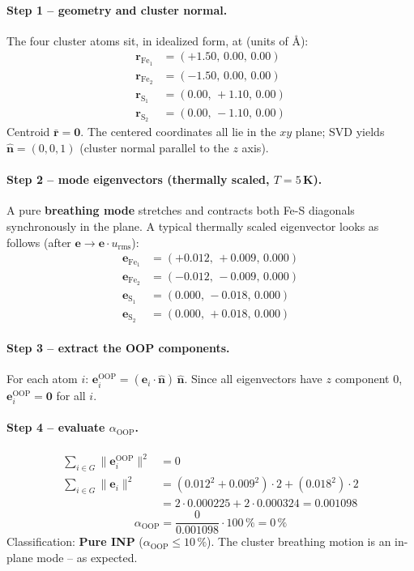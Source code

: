 \documentclass[11pt,a4paper,twoside]{article}
\providecommand{\angstrom}{\text{\AA}}    %
\newcommand{\OOP}{\mathrm{OOP}}
\theoremstyle{remark}
\begin{document}
\paragraph{Step 1 -- geometry and cluster normal.}
The four cluster atoms sit, in idealized form, at (units of $\angstrom$):
\begin{align*}
  \mathbf{r}_{\text{Fe}_1} &= (+1.50,\, 0.00,\, 0.00) \\
  \mathbf{r}_{\text{Fe}_2} &= (-1.50,\, 0.00,\, 0.00) \\
  \mathbf{r}_{\text{S}_1}  &= ( 0.00,\, +1.10,\, 0.00) \\
  \mathbf{r}_{\text{S}_2}  &= ( 0.00,\, -1.10,\, 0.00)
\end{align*}
Centroid $\bar{\mathbf{r}} = \mathbf{0}$. The centered coordinates
all lie in the $xy$ plane; SVD yields
$\hat{\mathbf{n}} = (0, 0, 1)$ (cluster normal parallel to the $z$ axis).

\paragraph{Step 2 -- mode eigenvectors (thermally scaled, $T=5$\,K).}
A pure \textbf{breathing mode} stretches and contracts both Fe-S
diagonals synchronously in the plane. A typical thermally scaled
eigenvector looks as follows (after $\mathbf{e} \to \mathbf{e}\cdot u_\text{rms}$):
\begin{align*}
  \mathbf{e}_{\text{Fe}_1} &= (+0.012,\, +0.009,\, 0.000) \\
  \mathbf{e}_{\text{Fe}_2} &= (-0.012,\, -0.009,\, 0.000) \\
  \mathbf{e}_{\text{S}_1}  &= ( 0.000,\, -0.018,\, 0.000) \\
  \mathbf{e}_{\text{S}_2}  &= ( 0.000,\, +0.018,\, 0.000)
\end{align*}

\paragraph{Step 3 -- extract the OOP components.}
For each atom $i$:
$\mathbf{e}_i^\text{OOP} = (\mathbf{e}_i \cdot \hat{\mathbf{n}})\,
\hat{\mathbf{n}}$. Since all eigenvectors have $z$ component $0$,
$\mathbf{e}_i^\text{OOP} = \mathbf{0}$ for all $i$.

\paragraph{Step 4 -- evaluate $\alpha_{\OOP}$.}
\begin{align*}
  \sum_{i \in G} \|\mathbf{e}_i^\text{OOP}\|^2 &= 0 \\
  \sum_{i \in G} \|\mathbf{e}_i\|^2 &= (0.012^2 + 0.009^2)\cdot 2 + (0.018^2)\cdot 2 \\
   &= 2\cdot 0.000225 + 2\cdot 0.000324 = 0.001098
\end{align*}
\begin{equation*}
  \alpha_{\OOP} = \frac{0}{0.001098}\cdot 100\,\% = 0\,\%
\end{equation*}
Classification: \textbf{Pure INP} ($\alpha_{\OOP} \leq 10\,\%$). The
cluster breathing motion is an in-plane mode -- as expected.
\end{document}
